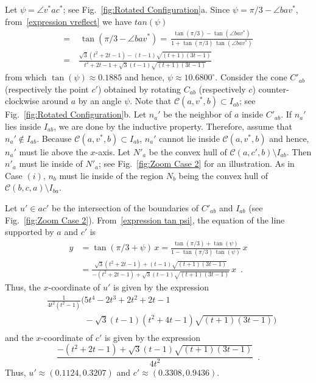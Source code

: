 \documentclass{cccg14}
\newcommand{\creflect}{\ensuremath{c^*}\xspace}
\newcommand{\vreflect}{\ensuremath{v^*}\xspace}
\begin{document}
Let $\psi = \angle \vreflect a \creflect$; see Fig.~\ref{fig:Rotated Configuration}a.
Since $\psi = \pi/3 - \angle ba\vreflect$,
from~\eqref{expression vreflect}
we have $tan(\psi) $\vspace{-.09in}
\begin{align}
\nonumber
=&\,  \tan(\pi/3 - \angle ba\vreflect)
\nonumber
= \,  \frac{\tan(\pi/3) - \tan(\angle ba\vreflect)}{1+\tan(\pi/3)\,\tan(\angle ba\vreflect)}\\ 
\label{expression tan psi}
= \, & \frac{\sqrt{3}\left(t^2+2t-1\right)-(t-1)\sqrt{(t+1)(3t-1)}}
{t^2+2t-1+\sqrt{3}(t-1)\sqrt{(t+1)(3t-1)}}
\end{align}
from which $\tan(\psi) \approx 0.1885$ and hence, $\psi \approx 10.6800^\circ$.
Consider the cone $C'_{ab}$
(respectively the point $c'$)
obtained by rotating $C_{ab}$
(respectively $c$)
counter-clockwise around $a$ by an angle $\psi$.
Note that $\mathcal{C}(a,\vreflect,b) \subset I_{ab}$; see Fig.~\ref{fig:Rotated Configuration}b.
Let $n_a'$ be the neighbor of $a$ inside $C'_{ab}$. 
If $n_a'$ lies inside $I_{ab}$, we are done by the inductive property.
Therefore, assume that $n_a' \not\in I_{ab}$.
Because $\mathcal{C}(a,\vreflect,b) \subset I_{ab}$, $n_a'$ cannot lie inside $\mathcal{C}(a,\vreflect,b)$ and hence,
$n_a'$ must lie above the $x$-axis. 
Let $N'_a$ be the convex hull of $\mathcal C(a, c', b) \setminus I_{ab}$. Then $n'_a$ 
must lie inside of $N'_a$; see Fig.~\ref{fig:Zoom Case 2} for an illustration.
As in Case $(i)$, $n_b$ must lie inside of the region $N_b$ being the convex hull of $\mathcal C(b, c, a) \setminus I_{ba}$.

Let $u' \in ac'$ be the intersection of the boundaries of $C'_{ab}$ and $I_{ab}$
(see Fig.~\ref{fig:Zoom Case 2}).
From~\eqref{expression tan psi},
the equation of the line supported by $a$ and $c'$ is
\begin{align*}
y &= \tan(\pi/3 + \psi)\,x = \frac{\tan(\pi/3) + \tan(\psi)}{1-\tan(\pi/3)\,\tan(\psi)} \,x\\
&= \frac{\sqrt{3}\left(t^2+2t-1\right)+(t-1)\sqrt{(t+1)(3t-1)}}
{-\left(t^2+2t-1\right)+\sqrt{3}(t-1)\sqrt{(t+1)(3t-1)}} \,x \enspace.
\end{align*}
Thus,
the $x$-coordinate of $u'$ is given by the expression
\begin{align*}
&\frac{1}{4t^2(t^2-1)}\Big(5t^4-2t^3+2t^2+2t-1\\
&\phantom{\frac{1}{4t^2(t^2-1)}\Big(}-\sqrt{3}(t-1)(t^2+4t-1)\sqrt{(t+1)(3t-1)}\Big)
\end{align*}
and the $x$-coordinate of $c'$ is given by the expression
$$\frac{-(t^2+2t-1)+\sqrt{3}(t-1)\sqrt{(t+1)(3t-1)}}{4t^2} \enspace.$$
Thus,
$u' \approx (0.1124, 0.3207)$
and $c'\approx(0.3308,0.9436)$.
\end{document}
